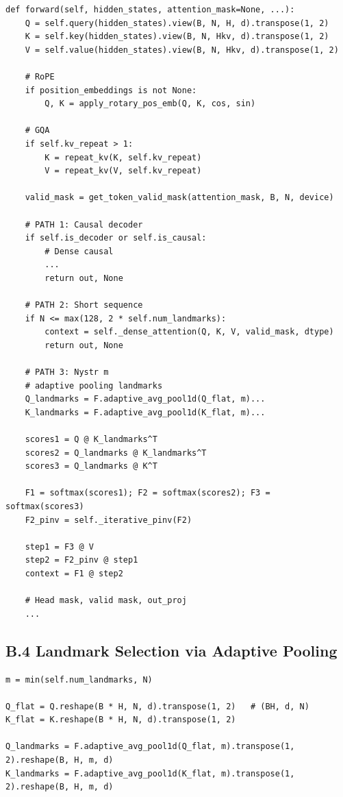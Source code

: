 \begin{lstlisting}
def forward(self, hidden_states, attention_mask=None, ...):
    Q = self.query(hidden_states).view(B, N, H, d).transpose(1, 2)
    K = self.key(hidden_states).view(B, N, Hkv, d).transpose(1, 2)
    V = self.value(hidden_states).view(B, N, Hkv, d).transpose(1, 2)
    
    # RoPE
    if position_embeddings is not None:
        Q, K = apply_rotary_pos_emb(Q, K, cos, sin)
    
    # GQA
    if self.kv_repeat > 1:
        K = repeat_kv(K, self.kv_repeat)
        V = repeat_kv(V, self.kv_repeat)
    
    valid_mask = get_token_valid_mask(attention_mask, B, N, device)
    
    # PATH 1: Causal decoder
    if self.is_decoder or self.is_causal:
        # Dense causal
        ...
        return out, None
    
    # PATH 2: Short sequence
    if N <= max(128, 2 * self.num_landmarks):
        context = self._dense_attention(Q, K, V, valid_mask, dtype)
        return out, None
    
    # PATH 3: Nystr m
    # adaptive pooling landmarks
    Q_landmarks = F.adaptive_avg_pool1d(Q_flat, m)...
    K_landmarks = F.adaptive_avg_pool1d(K_flat, m)...
    
    scores1 = Q @ K_landmarks^T
    scores2 = Q_landmarks @ K_landmarks^T
    scores3 = Q_landmarks @ K^T
    
    F1 = softmax(scores1); F2 = softmax(scores2); F3 = softmax(scores3)
    F2_pinv = self._iterative_pinv(F2)
    
    step1 = F3 @ V
    step2 = F2_pinv @ step1
    context = F1 @ step2
    
    # Head mask, valid mask, out_proj
    ...
\end{lstlisting}

\subsection{B.4 Landmark Selection via Adaptive Pooling}

\begin{lstlisting}
m = min(self.num_landmarks, N)

Q_flat = Q.reshape(B * H, N, d).transpose(1, 2)   # (BH, d, N)
K_flat = K.reshape(B * H, N, d).transpose(1, 2)

Q_landmarks = F.adaptive_avg_pool1d(Q_flat, m).transpose(1, 2).reshape(B, H, m, d)
K_landmarks = F.adaptive_avg_pool1d(K_flat, m).transpose(1, 2).reshape(B, H, m, d)
\end{lstlisting}

